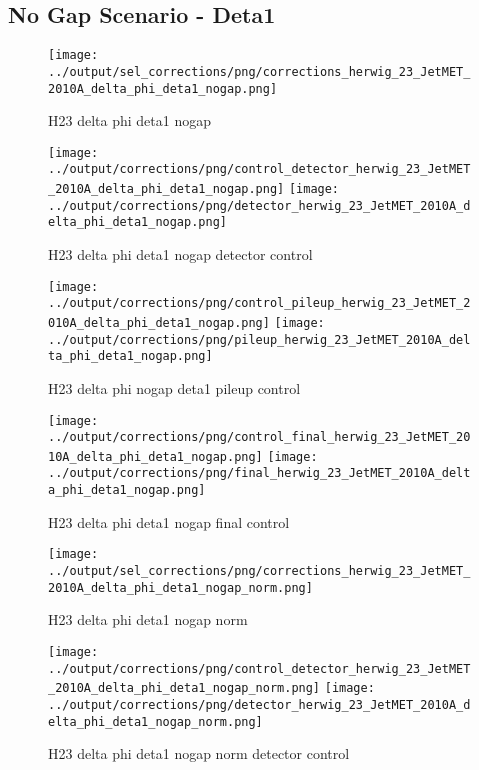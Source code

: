 \documentclass[11pt]{book}
\begin{document}
\clearpage
\subsection{No Gap Scenario - Deta1}
\begin{figure}[ht]
\centering
\texttt{[image: ../output/sel\_corrections/png/corrections\_herwig\_23\_JetMET\_2010A\_delta\_phi\_deta1\_nogap.png]}
\caption{H23 delta phi deta1 nogap}
\label{fig:H23_JetMET_2010A_delta_phi_deta1_nogap}
\end{figure}

\begin{figure}[ht]
\centering
\texttt{[image: ../output/corrections/png/control\_detector\_herwig\_23\_JetMET\_2010A\_delta\_phi\_deta1\_nogap.png]}
\texttt{[image: ../output/corrections/png/detector\_herwig\_23\_JetMET\_2010A\_delta\_phi\_deta1\_nogap.png]}
\caption{H23 delta phi deta1 nogap detector control}
\label{fig:H23_JetMET_2010A_delta_phi_deta1_nogap_detector_control}
\end{figure}

\begin{figure}[ht]
\centering
\texttt{[image: ../output/corrections/png/control\_pileup\_herwig\_23\_JetMET\_2010A\_delta\_phi\_deta1\_nogap.png]}
\texttt{[image: ../output/corrections/png/pileup\_herwig\_23\_JetMET\_2010A\_delta\_phi\_deta1\_nogap.png]}
\caption{H23 delta phi nogap deta1 pileup control}
\label{fig:H23_JetMET_2010A_delta_phi_deta1_nogap_pileup_control}
\end{figure}


\begin{figure}[ht]
\centering
\texttt{[image: ../output/corrections/png/control\_final\_herwig\_23\_JetMET\_2010A\_delta\_phi\_deta1\_nogap.png]}
\texttt{[image: ../output/corrections/png/final\_herwig\_23\_JetMET\_2010A\_delta\_phi\_deta1\_nogap.png]}
\caption{H23 delta phi deta1 nogap final control}
\label{fig:H23_JetMET_2010A_delta_phi_deta1_nogap_final_control}
\end{figure}

\begin{figure}[ht]
\centering
\texttt{[image: ../output/sel\_corrections/png/corrections\_herwig\_23\_JetMET\_2010A\_delta\_phi\_deta1\_nogap\_norm.png]}
\caption{H23 delta phi deta1 nogap norm}
\label{fig:H23_JetMET_2010A_delta_phi_deta1_nogap_norm}
\end{figure}

\begin{figure}[ht]
\centering
\texttt{[image: ../output/corrections/png/control\_detector\_herwig\_23\_JetMET\_2010A\_delta\_phi\_deta1\_nogap\_norm.png]}
\texttt{[image: ../output/corrections/png/detector\_herwig\_23\_JetMET\_2010A\_delta\_phi\_deta1\_nogap\_norm.png]}
\caption{H23 delta phi deta1 nogap norm detector control}
\label{fig:H23_JetMET_2010A_delta_phi_deta1_nogap_norm_detector_control}
\end{figure}
\end{document}
